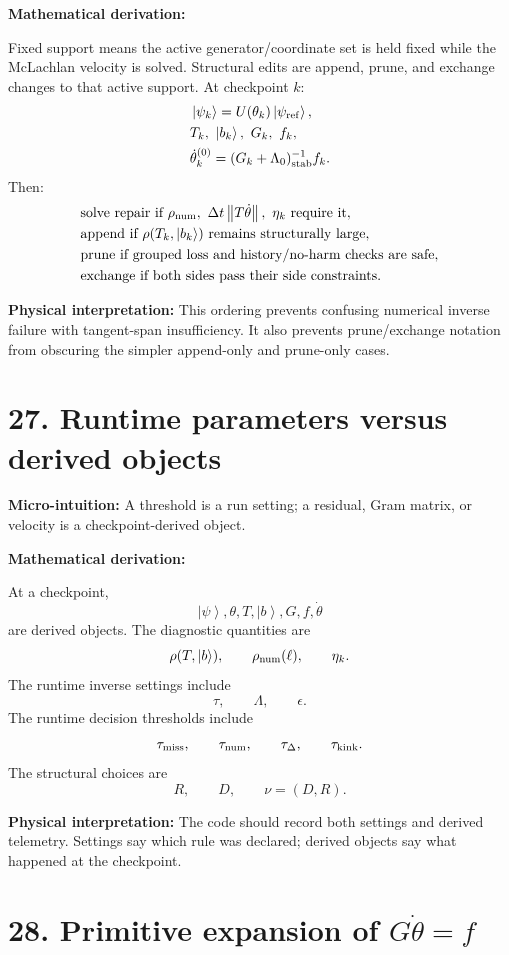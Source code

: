 \documentclass[10pt,twocolumn]{article}
\newcommand{\ket}[1]{\left|#1\right\rangle}
\newcommand{\norm}[1]{\left\lVert #1\right\rVert}
\newcommand{\micro}[1]{%
  \par\smallskip
  \noindent\textcolor{deepblue}{\textbf{Micro-intuition:}} #1
  \par\smallskip}
\newcommand{\deriv}{%
  \par\noindent\textcolor{deepviolet}{\textbf{Mathematical derivation:}}\par\vspace{-1mm}}
\newcommand{\phys}[1]{%
  \par\smallskip
  \noindent\textcolor{deepgreen}{\textbf{Physical interpretation:}} #1
  \par\smallskip}
\begin{document}
\deriv
Fixed support means the active generator/coordinate set is held fixed while the
McLachlan velocity is solved. Structural edits are append, prune, and exchange
changes to that active support.
At checkpoint \(k\):
\[
\begin{aligned}
&\ket{\psi_k}=U(\theta_k)\ket{\psi_{\rm ref}},\\
&T_k,\ \ket{b_k},\ G_k,\ f_k,\\
&\dot\theta_k^{(0)}=(G_k+\Lambda_0)_{\rm stab}^{-1}f_k.
\end{aligned}
\]
Then:
\[
\begin{aligned}
&\text{solve repair if }
\rho_{\rm num},\ \Delta t\norm{T\dot\theta},\ \eta_k
\text{ require it},\\
&\text{append if }\rho(T_k,\ket{b_k})\text{ remains structurally large},\\
&\text{prune if grouped loss and history/no-harm checks are safe},\\
&\text{exchange if both sides pass their side constraints}.
\end{aligned}
\]

\phys{This ordering prevents confusing numerical inverse failure with
tangent-span insufficiency. It also prevents prune/exchange notation from obscuring
the simpler append-only and prune-only cases.}

\section*{27. Runtime parameters versus derived objects}

\micro{A threshold is a run setting; a residual, Gram matrix, or velocity is a
checkpoint-derived object.}

\deriv
At a checkpoint,
\[
\ket\psi,\theta,T,\ket b,G,f,\dot\theta
\]
are derived objects. The diagnostic quantities are
\[
\rho(T,\ket b),\qquad \rho_{\rm num}(\ell),\qquad \eta_k.
\]
The runtime inverse settings include
\[
\tau,\qquad \Lambda,\qquad \epsilon.
\]
The runtime decision thresholds include
\[
\tau_{\rm miss},\qquad
\tau_{\rm num},\qquad
\tau_\Delta,\qquad
\tau_{\rm kink}.
\]
The structural choices are
\[
R,\qquad D,\qquad \nu=(D,R).
\]

\phys{The code should record both settings and derived telemetry. Settings say
which rule was declared; derived objects say what happened at the checkpoint.}

\section*{28. Primitive expansion of \(G\dot\theta=f\)}
\end{document}
